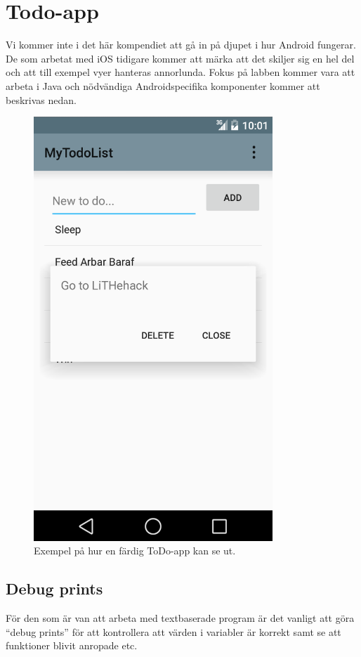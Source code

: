 \documentclass[11 pt, titlepage]{article} %
\begin{document}
\section{Todo-app}
Vi kommer inte i det här kompendiet att gå in på djupet i hur Android fungerar.
De som arbetat med iOS tidigare kommer att märka att det skiljer sig en hel del och att till exempel vyer hanteras annorlunda.
Fokus på labben kommer vara att arbeta i Java och nödvändiga Androidspecifika komponenter kommer att beskrivas nedan.
\begin{figure}[ht!]
\centering
\includegraphics[width=90mm]{images/app.png}
\caption{Exempel på hur en färdig ToDo-app kan se ut.}
\label{overflow}
\end{figure}
\subsection{Debug prints}
För den som är van att arbeta med textbaserade program är det vanligt att göra “debug prints” för att kontrollera att värden i variabler är korrekt samt se att funktioner blivit anropade etc.
\end{document}
